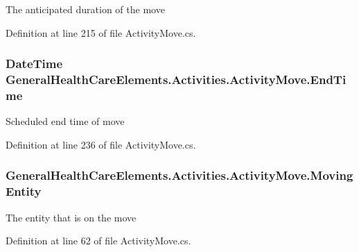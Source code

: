 The anticipated duration of the move 



Definition at line 215 of file Activity\+Move.\+cs.

\subsubsection[{\texorpdfstring{End\+Time}{EndTime}}]{\setlength{\rightskip}{0pt plus 5cm}Date\+Time General\+Health\+Care\+Elements.\+Activities.\+Activity\+Move.\+End\+Time\hspace{0.3cm}{\ttfamily [get]}}\hypertarget{class_general_health_care_elements_1_1_activities_1_1_activity_move_a15980148c18781b501c0f876124d9dc8}{}\label{class_general_health_care_elements_1_1_activities_1_1_activity_move_a15980148c18781b501c0f876124d9dc8}


Scheduled end time of move 



Definition at line 236 of file Activity\+Move.\+cs.

\subsubsection[{\texorpdfstring{Moving\+Entity}{MovingEntity}}]{ General\+Health\+Care\+Elements.\+Activities.\+Activity\+Move.\+Moving\+Entity\hspace{0.3cm}{\ttfamily [get]}}\hypertarget{class_general_health_care_elements_1_1_activities_1_1_activity_move_ad233f90422824196cf83ac191300ebc2}{}\label{class_general_health_care_elements_1_1_activities_1_1_activity_move_ad233f90422824196cf83ac191300ebc2}


The entity that is on the move 



Definition at line 62 of file Activity\+Move.\+cs.

